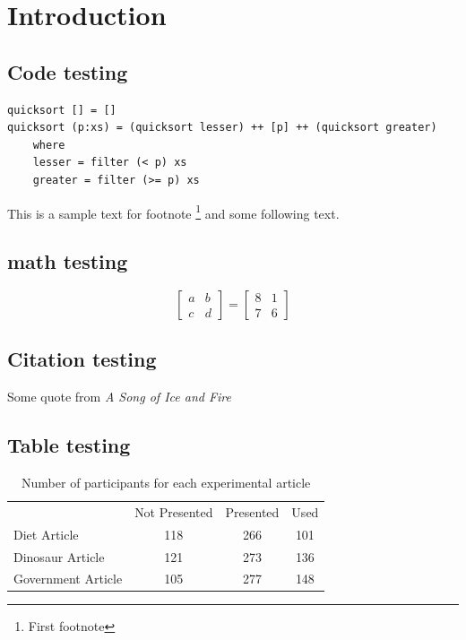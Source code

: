 \chapter{Introduction}\label{chapter:intro}

\section{Code testing}

\blindtext

\begin{verbatim}
quicksort [] = []
quicksort (p:xs) = (quicksort lesser) ++ [p] ++ (quicksort greater)
    where
    lesser = filter (< p) xs
    greater = filter (>= p) xs
\end{verbatim}

This is a sample text for footnote \footnote{First footnote \blindtext} and
some following text.

\section{math testing}

\[
\begin{bmatrix}
    a  &  b \\
    c  &  d      
\end{bmatrix}
= 
\begin{bmatrix}
    8  &  1 \\
    7  &  6      
\end{bmatrix}
\]

\section{Citation testing}

Some quote from \emph{A Song of Ice and Fire}\cite{dance-with-dragons}

\section{Table testing}

\begin{table}[htb]
    \centering
    \begin{tabular}{lccc}
        & Not Presented & Presented & Used \\
        Diet Article       & 118           & 266       & 101  \\
        Dinosaur Article   & 121           & 273       & 136  \\
        Government Article & 105           & 277       & 148 
    \end{tabular}
    \caption{Number of participants for each experimental article}
\end{table}

